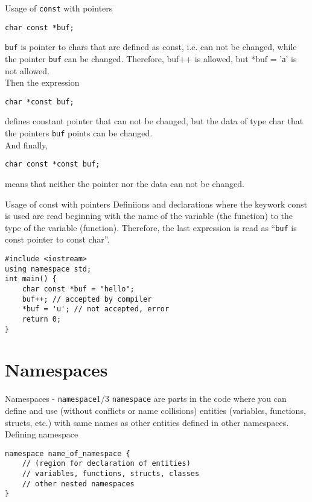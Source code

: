 \begin{frame}[fragile]{Usage of \texttt{const} with pointers}
\begin{lstlisting}
char const *buf;
\end{lstlisting}
\texttt{buf} is pointer to chars that are defined as const, i.e. can not be
changed, while the pointer \texttt{buf} can be changed. Therefore, buf++ is
allowed, but *buf = 'а' is not allowed.\\
Then the expression
\begin{lstlisting}
char *const buf;
\end{lstlisting}
defines constant pointer that can not be changed, but the data of type char that
the pointers \texttt{buf} points can be changed.\\ 
And finally,
\begin{lstlisting}
char const *const buf;
\end{lstlisting}
means that neither the pointer nor the data can not be changed.
\end{frame}

\begin{frame}[fragile]{Usage of const with pointers}
Definiions and declarations where the keywork const is used are read beginning
with the name of the variable (the function) to the type of the variable
(function). Therefore, the last expression is read as ``\texttt{buf} is const
pointer to const char''.
\begin{lstlisting}
#include <iostream>
using namespace std;
int main() {
    char const *buf = "hello";
    buf++; // accepted by compiler
    *buf = 'u'; // not accepted, error
    return 0;
}
\end{lstlisting}
\end{frame}

\section{Namespaces}
\begin{frame}[fragile]{Namespaces - \texttt{namespace}}{1/3}
\texttt{namespace} are parts in the code where you can define and use (without
conflicts or name collisions) entities (variables, functions, structs, etc.)
with same names as other entities defined in other namespaces.\\
Defining namespace
\begin{lstlisting}
namespace name_of_namespace {
    // (region for declaration of entities)
    // variables, functions, structs, classes
    // other nested namespaces
}
\end{lstlisting}
\end{frame}

